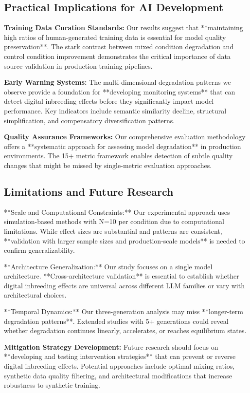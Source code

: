 \documentclass{article}
\begin{document}
\subsection{Practical Implications for AI Development}

\textbf{Training Data Curation Standards:} Our results suggest that **maintaining high ratios of human-generated training data is essential for model quality preservation**. The stark contrast between mixed condition degradation and control condition improvement demonstrates the critical importance of data source validation in production training pipelines.

\textbf{Early Warning Systems:} The multi-dimensional degradation patterns we observe provide a foundation for **developing monitoring systems** that can detect digital inbreeding effects before they significantly impact model performance. Key indicators include semantic similarity decline, structural simplification, and compensatory diversification patterns.

\textbf{Quality Assurance Frameworks:} Our comprehensive evaluation methodology offers a **systematic approach for assessing model degradation** in production environments. The 15+ metric framework enables detection of subtle quality changes that might be missed by single-metric evaluation approaches.

\subsection{Limitations and Future Research}

**Scale and Computational Constraints:** Our experimental approach uses simulation-based methods with N=10 per condition due to computational limitations. While effect sizes are substantial and patterns are consistent, **validation with larger sample sizes and production-scale models** is needed to confirm generalizability.

**Architecture Generalization:** Our study focuses on a single model architecture. **Cross-architecture validation** is essential to establish whether digital inbreeding effects are universal across different LLM families or vary with architectural choices.

**Temporal Dynamics:** Our three-generation analysis may miss **longer-term degradation patterns**. Extended studies with 5+ generations could reveal whether degradation continues linearly, accelerates, or reaches equilibrium states.

\textbf{Mitigation Strategy Development:} Future research should focus on **developing and testing intervention strategies** that can prevent or reverse digital inbreeding effects. Potential approaches include optimal mixing ratios, synthetic data quality filtering, and architectural modifications that increase robustness to synthetic training.
\end{document}
